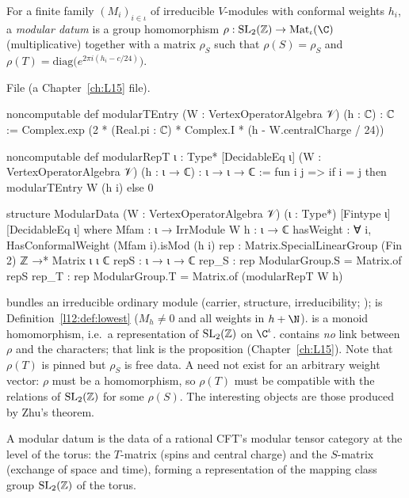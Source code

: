 \begin{definition}\label{l14:def:moddata}
For a finite family $(M_i)_{i\in\iota}$ of irreducible $V$-modules with conformal weights $h_i$, a \emph{modular datum} is a
group homomorphism $\rho:\lfourteenSL\to\mathrm{Mat}_\iota(\C)$ (multiplicative) together with a matrix $\rho_S$ such that
$\rho(S) = \rho_S$ and $\rho(T) = \mathrm{diag}\bigl(e^{2\pi i(h_i-c/24)}\bigr)$.
\end{definition}
\noindent File  (a Chapter~\ref{ch:L15} file).
\begin{leancode}
noncomputable def modularTEntry (W : VertexOperatorAlgebra 𝒱) (h : ℂ) : ℂ :=
  Complex.exp (2 * (Real.pi : ℂ) * Complex.I * (h - W.centralCharge / 24))

noncomputable def modularRepT {ι : Type*} [DecidableEq ι] (W : VertexOperatorAlgebra 𝒱)
    (h : ι → ℂ) : ι → ι → ℂ :=
  fun i j => if i = j then modularTEntry W (h i) else 0

structure ModularData (W : VertexOperatorAlgebra 𝒱) (ι : Type*) [Fintype ι] [DecidableEq ι] where
  Mfam : ι → IrrModule W
  h : ι → ℂ
  hasWeight : ∀ i, HasConformalWeight (Mfam i).isMod (h i)
  rep : Matrix.SpecialLinearGroup (Fin 2) ℤ →* Matrix ι ι ℂ
  repS : ι → ι → ℂ
  rep_S : rep ModularGroup.S = Matrix.of repS
  rep_T : rep ModularGroup.T = Matrix.of (modularRepT W h)
\end{leancode}
\begin{dictionary}
 bundles an irreducible ordinary module (carrier, structure, irreducibility; );
 is Definition~\ref{l12:def:lowest} ($M_h\neq0$ and all weights in $h+\N$).  is a monoid
homomorphism, i.e.\ a representation of $\mathrm{SL}_2(\mathbb{Z})$ on $\C^\iota$.  contains \emph{no} link between
$\rho$ and the characters; that link is the proposition  (Chapter~\ref{ch:L15}). Note that
$\rho(T)$ is pinned but $\rho_S$ is free data. A  need not exist for an arbitrary weight vector: $\rho$
must be a homomorphism, so $\rho(T)$ must be compatible with the relations of $\mathrm{SL}_2(\mathbb{Z})$ for some $\rho(S)$. The interesting objects are those produced by Zhu's theorem.
\end{dictionary}
\begin{physics}
A modular datum is the data of a rational CFT's modular tensor category at the level of the torus: the $T$-matrix (spins and central charge) and the $S$-matrix (exchange of space and time), forming a representation of the mapping class group $\mathrm{SL}_2(\mathbb{Z})$ of the torus.
\end{physics}

